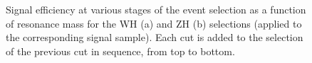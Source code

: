 \begin{figure}[htbp!]
\begin{center}
\end{center}
\caption{Signal efficiency at various stages of the event selection as a function of resonance mass for the WH (a) and ZH (b) selections (applied to the corresponding signal sample).
    Each cut is added to the selection of the previous cut in sequence, from top to bottom.
}
\label{fig:effVH}
\end{figure}

